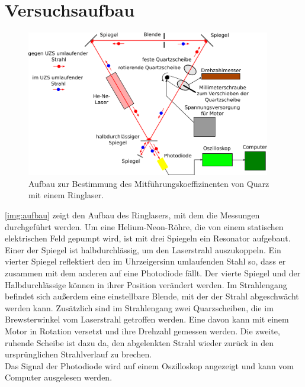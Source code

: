 \section{Versuchsaufbau}
\label{sec:aufbau}

\begin{figure}[H]
\begin{center}
  \includegraphics[width=0.95\textwidth]{../img/aufbau.pdf}
  \caption{Aufbau zur Bestimmung des Mitführungskoeffizinenten von Quarz mit einem Ringlaser.}
  \label{img:aufbau}
\end{center}
\end{figure}
\autoref{img:aufbau} zeigt den Aufbau des Ringlasers,
mit dem die Messungen durchgeführt werden.
Um eine Helium-Neon-Röhre,
die von einem statischen elektrischen Feld gepumpt wird,
ist mit drei Spiegeln ein Resonator aufgebaut.
Einer der Spiegel ist halbdurchlässig, um den Laserstrahl auszukoppeln.
Ein vierter Spiegel reflektiert den im Uhrzeigersinn umlaufenden Stahl so,
dass er zusammen mit dem anderen auf eine Photodiode fällt.
Der vierte Spiegel und der Halbdurchlässige können in ihrer Position verändert werden.
Im Strahlengang befindet sich außerdem eine einstellbare Blende,
mit der der Strahl abgeschwächt werden kann.
Zusätzlich sind im Strahlengang zwei Quarzscheiben,
die im Brewsterwinkel vom Laserstrahl getroffen werden.
Eine davon kann mit einem Motor in Rotation versetzt und ihre Drehzahl gemessen werden.
Die zweite, ruhende Scheibe ist dazu da,
den abgelenkten Strahl wieder zurück in den ursprünglichen Strahlverlauf zu brechen.\\
Das Signal der Photodiode wird auf einem Oszilloskop angezeigt und kann
vom Computer ausgelesen werden.